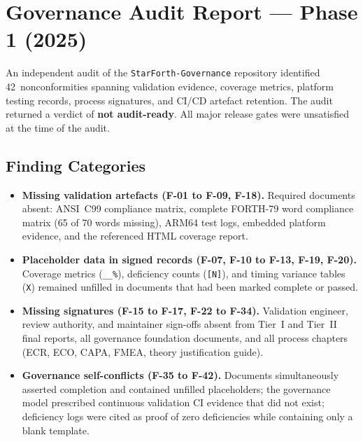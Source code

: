 
\section{Governance Audit Report --- Phase 1 (2025)}

An independent audit of the \texttt{StarForth-Governance} repository identified
42~nonconformities spanning validation evidence, coverage metrics, platform testing
records, process signatures, and CI/CD artefact retention. The audit returned a verdict
of \textbf{not audit-ready}. All major release gates were unsatisfied at the time of
the audit.

\subsection{Finding Categories}

\begin{itemize}
  \item \textbf{Missing validation artefacts (F-01 to F-09, F-18).}
        Required documents absent: ANSI~C99 compliance matrix, complete FORTH-79 word
        compliance matrix (65 of 70 words missing), ARM64 test logs,
        embedded platform evidence, and the referenced HTML coverage report.
  \item \textbf{Placeholder data in signed records (F-07, F-10 to F-13, F-19, F-20).}
        Coverage metrics (\texttt{\_\_\%}), deficiency counts (\texttt{[N]}), and
        timing variance tables (\texttt{X}) remained unfilled in documents that had
        been marked complete or passed.
  \item \textbf{Missing signatures (F-15 to F-17, F-22 to F-34).}
        Validation engineer, review authority, and maintainer sign-offs absent from
        Tier~I and Tier~II final reports, all governance foundation documents, and all
        process chapters (ECR, ECO, CAPA, FMEA, theory justification guide).
  \item \textbf{Governance self-conflicts (F-35 to F-42).}
        Documents simultaneously asserted completion and contained unfilled placeholders;
        the governance model prescribed continuous validation CI evidence that did not
        exist; deficiency logs were cited as proof of zero deficiencies while containing
        only a blank template.
\end{itemize}

